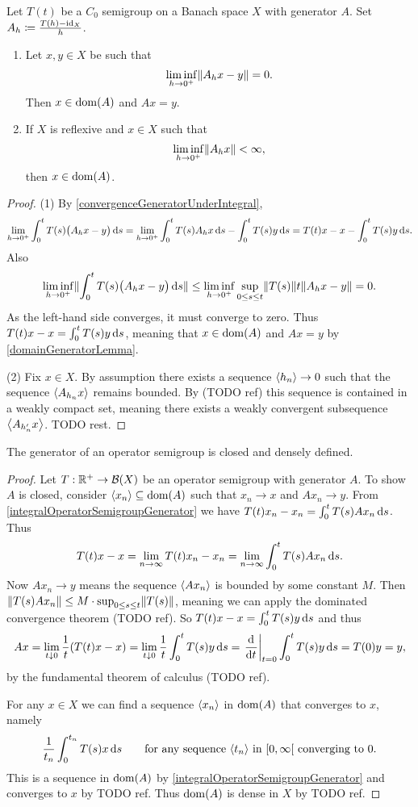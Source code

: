\begin{proposition} \label{convergenceGeneratorLiminf}
Let $T(t)$ be a $C_0$ semigroup on a Banach space $X$ with generator $A$. Set $A_h \coloneqq \frac{T(h) - \operatorname{id}_X}{h}$.
\begin{enumerate}
\item Let $x,y\in X$ be such that
\[ \liminf_{h \to 0^+}\lVert A_hx - y\rVert = 0. \]
Then $x\in \operatorname{dom}(A)$ and $Ax = y$.
\item If $X$ is reflexive and $x\in X$ such that
\[ \liminf_{h\to 0^+}\lVert A_hx\rVert <\infty, \]
then $x\in \operatorname{dom}(A)$.
\end{enumerate}
\end{proposition}
\begin{proof}
(1) By \ref{convergenceGeneratorUnderIntegral},
\[ \lim_{h\to 0^+}\int_0^t T(s)\big(A_hx - y\big)\operatorname{d \!}{s} = \lim_{h\to 0^+}\int_0^t T(s)A_hx\operatorname{d \!}{s} - \int_0^t T(s)y\operatorname{d \!}{s} = T(t)x - x - \int_0^t T(s)y\operatorname{d \!}{s}. \]
Also
\[ \liminf_{h\to 0^+}\lVert\int_0^t T(s)\big(A_hx - y\big)\operatorname{d \!}{s}\rVert \leq \liminf_{h\to 0^+}\sup_{0\leq s\leq t}\lVert T(s)\rVert t\lVert A_hx - y\rVert = 0. \]
As the left-hand side converges, it must converge to zero. Thus $T(t)x - x = \int_0^t T(s)y\operatorname{d \!}{s}$, meaning that $x\in\operatorname{dom}(A)$ and $Ax = y$ by \ref{domainGeneratorLemma}.

(2) Fix $x\in X$. By assumption there exists a sequence $\left\langle h_n \right\rangle\to 0$ such that the sequence $\left\langle A_{h_n}x \right\rangle$ remains bounded. By (TODO ref) this sequence is contained in a weakly compact set, meaning there exists a weakly convergent subsequence $\left\langle A_{h'_n}x \right\rangle$. TODO rest.
\end{proof}

\begin{proposition} \label{generatorClosedDenselyDefined}
The generator of an operator semigroup is closed and densely defined.
\end{proposition}
\begin{proof}
Let $T: \mathbb{R}^+\to \operatorname{\mathcal{B}}(X)$ be an operator semigroup with generator $A$. To show $A$ is closed, consider $\left\langle x_n \right\rangle\subseteq \operatorname{dom}(A)$ such that $x_n\to x$ and $Ax_n \to y$. From \ref{integralOperatorSemigroupGenerator} we have $T(t)x_n - x_n = \int_0^tT(s)Ax_n\operatorname{d \!}{s}$. Thus
\[ T(t)x-x = \lim_{n\to\infty} T(t)x_n - x_n = \lim_{n\to\infty} \int_0^tT(s)Ax_n\operatorname{d \!}{s}. \]
Now $Ax_n \to y$ means the sequence $\left\langle Ax_n \right\rangle$ is bounded by some constant $M$. Then $\lVert T(s)Ax_n\rVert \leq M\cdot\sup_{0\leq s \leq t}\lVert T(s)\rVert$, meaning we can apply the dominated convergence theorem (TODO ref). So $T(t)x-x = \int_0^tT(s)y\operatorname{d \!}{s}$ and thus
\[ Ax = \lim_{t\downarrow 0}\frac{1}{t}(T(t)x-x) = \lim_{t\downarrow 0}\frac{1}{t}\int_0^tT(s)y\operatorname{d \!}{s} = \left.\mathinner{ \dfrac{\operatorname{d \!}{^{}}}{\operatorname{d \!}{{t}^{}}} }\right|_{t=0}\int_0^tT(s)y\operatorname{d \!}{s} = T(0)y = y, \]
by the fundamental theorem of calculus (TODO ref).

For any $x\in X$ we can find a sequence $\left\langle x_n \right\rangle$ in $\operatorname{dom}(A)$ that converges to $x$, namely
\[ \frac{1}{t_n}\int^{t_n}_0T(s)x\operatorname{d \!}{s} \qquad \text{for any sequence $\left\langle t_n \right\rangle$ in $[0,\infty[$ converging to $0$.}  \]
This is a sequence in $\operatorname{dom}(A)$ by \ref{integralOperatorSemigroupGenerator} and converges to $x$ by TODO ref. Thus $\operatorname{dom}(A)$ is dense in $X$ by TODO ref.
\end{proof}

